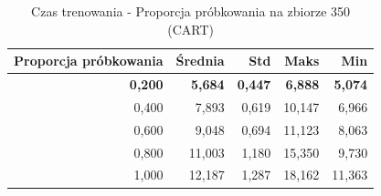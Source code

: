 \begin{table}[htbp]
\centering
\small
\setlength{\tabcolsep}{6pt}
\renewcommand{\arraystretch}{1.2}
\caption{Czas trenowania - Proporcja próbkowania na zbiorze 350 (CART)}
\label{tab:CART_sample_ratio_350_time}
\begin{tabular}{r|r|r|r|r}
\toprule
Proporcja próbkowania & Średnia & Std & Maks & Min \\
\hline
\textbf{0,200} & \textbf{5,684} & \textbf{0,447} & \textbf{6,888} & \textbf{5,074} \\
0,400 & 7,893 & 0,619 & 10,147 & 6,966 \\
0,600 & 9,048 & 0,694 & 11,123 & 8,063 \\
0,800 & 11,003 & 1,180 & 15,350 & 9,730 \\
1,000 & 12,187 & 1,287 & 18,162 & 11,363 \\
\bottomrule
\end{tabular}
\end{table}